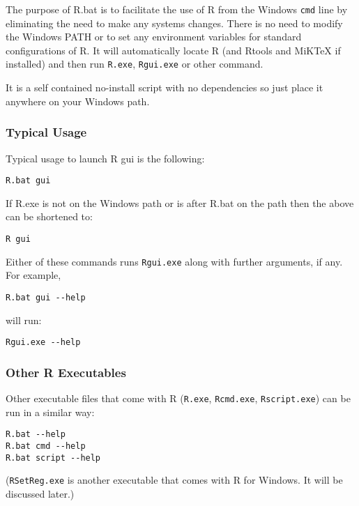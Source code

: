 The purpose of R.bat is to facilitate the use of R from the Windows
\texttt{cmd} line by eliminating the need to make any systems changes.
There is no need to modify the Windows PATH or to set any environment
variables for standard configurations of R. It will automatically locate
R (and Rtools and MiKTeX if installed) and then run \texttt{R.exe},
\texttt{Rgui.exe} or other command.

It is a self contained no-install script with no dependencies so just
place it anywhere on your Windows path.

\subsubsection{Typical Usage}

Typical usage to launch R gui is the following:

\begin{verbatim}
R.bat gui
\end{verbatim}

If R.exe is not on the Windows path or is after R.bat on the path then
the above can be shortened to:

\begin{verbatim}
R gui
\end{verbatim}

Either of these commands runs \texttt{Rgui.exe} along with further
arguments, if any. For example,

\begin{verbatim}
R.bat gui --help
\end{verbatim}

will run:

\begin{verbatim}
Rgui.exe --help
\end{verbatim}

\subsubsection{Other R Executables}

Other executable files that come with R (\texttt{R.exe},
\texttt{Rcmd.exe}, \texttt{Rscript.exe}) can be run in a similar way:

\begin{verbatim}
R.bat --help
R.bat cmd --help
R.bat script --help
\end{verbatim}

(\texttt{RSetReg.exe} is another executable that comes with R for
Windows. It will be discussed later.)

